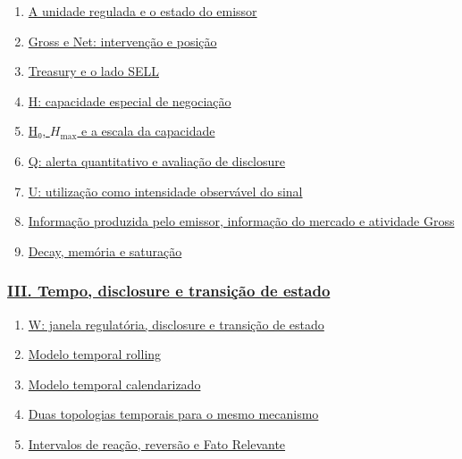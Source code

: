 \documentclass[
  a4paper,
]{article}
\providecommand{\tightlist}{%
  \setlength{\itemsep}{0pt}\setlength{\parskip}{0pt}}
\begin{document}
\begin{enumerate}
\def\labelenumi{\arabic{enumi}.}
\setcounter{enumi}{4}
\tightlist
\item
  \protect\hyperlink{5-a-unidade-regulada-e-o-estado-do-emissor}{A
  unidade regulada e o estado do emissor}
\item
  \protect\hyperlink{6-gross-e-net-intervencao-e-posicao}{Gross e Net:
  intervenção e posição}
\item
  \protect\hyperlink{7-treasury-e-o-lado-sell}{Treasury e o lado SELL}
\item
  \protect\hyperlink{8-h-capacidade-especial-de-negociacao}{H:
  capacidade especial de negociação}
\item
  \protect\hyperlink{9-h0-hmax-e-a-escala-da-capacidade}{H₀,
  \(H_{\max}\) e a escala da capacidade}
\item
  \protect\hyperlink{10-q-quando-a-utilizacao-da-capacidade-obriga-disclosure}{Q:
  alerta quantitativo e avaliação de disclosure}
\item
  \protect\hyperlink{11-u-utilizacao-como-intensidade-observavel-do-sinal}{U:
  utilização como intensidade observável do sinal}
\item
  \protect\hyperlink{12-informacao-produzida-pelo-emissor-informacao-do-mercado-e-atividade-gross}{Informação
  produzida pelo emissor, informação do mercado e atividade Gross}
\item
  \protect\hyperlink{13-decay-memoria-e-saturacao}{Decay, memória e
  saturação}
\end{enumerate}

\hypertarget{iii-tempo-disclosure-e-transiuxe7uxe3o-de-estado}{%
\subsubsection{\texorpdfstring{\protect\hyperlink{iii-tempo-disclosure-e-transicao-de-estado}{III.
Tempo, disclosure e transição de
estado}}{III. Tempo, disclosure e transição de estado}}\label{iii-tempo-disclosure-e-transiuxe7uxe3o-de-estado}}

\begin{enumerate}
\def\labelenumi{\arabic{enumi}.}
\setcounter{enumi}{13}
\tightlist
\item
  \protect\hyperlink{14-w-janela-regulatoria-disclosure-e-transicao-de-estado}{W:
  janela regulatória, disclosure e transição de estado}
\item
  \protect\hyperlink{15-modelo-temporal-rolling}{Modelo temporal
  rolling}
\item
  \protect\hyperlink{16-modelo-temporal-calendarizado}{Modelo temporal
  calendarizado}
\item
  \protect\hyperlink{17-o-que-realmente-diferencia-as-duas-branches}{Duas
  topologias temporais para o mesmo mecanismo}
\item
  \protect\hyperlink{18-cooldown-reversao-e-fato-relevante}{Intervalos
  de reação, reversão e Fato Relevante}
\end{enumerate}
\end{document}
